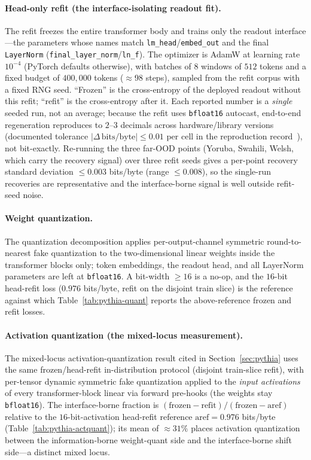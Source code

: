 \documentclass[twocolumn,10pt]{article}
\theoremstyle{definition}
\theoremstyle{remark}
\begin{document}
\paragraph{Head-only refit (the interface-isolating readout fit).} The
refit freezes the entire transformer body and trains only the readout
interface---the parameters whose names match
\texttt{lm\_head}/\texttt{embed\_out} and the final
\texttt{LayerNorm} (\texttt{final\_layer\_norm}/\texttt{ln\_f}). The
optimizer is AdamW at learning rate $10^{-4}$ (PyTorch defaults
otherwise), with batches of $8$ windows of $512$ tokens and a fixed
budget of $400{,}000$ tokens ($\approx 98$ steps), sampled from the
refit corpus with a fixed RNG seed. ``Frozen'' is the cross-entropy of
the deployed readout without this refit; ``refit'' is the cross-entropy
after it. Each reported number is a \emph{single} seeded run, not an
average; because the refit uses \texttt{bfloat16} autocast, end-to-end
regeneration reproduces to $2$--$3$ decimals across hardware/library
versions (documented tolerance $|\Delta\,\text{bits/byte}| \le 0.01$
per cell in the reproduction record~\cite{porepro}), not bit-exactly.
Re-running the three far-OOD points (Yoruba, Swahili, Welsh, which carry
the recovery signal) over three refit seeds gives a per-point recovery
standard deviation $\le 0.003$ bits/byte (range $\le 0.008$), so the
single-run recoveries are representative and the interface-borne signal
is well outside refit-seed noise.

\paragraph{Weight quantization.} The quantization decomposition applies
per-output-channel symmetric round-to-nearest fake quantization to the
two-dimensional linear weights inside the transformer blocks only;
token embeddings, the readout head, and all LayerNorm parameters are
left at \texttt{bfloat16}. A bit-width $\ge 16$ is a no-op, and the
$16$-bit head-refit loss ($0.976$ bits/byte, refit on the disjoint
train slice) is the reference against
which Table~\ref{tab:pythia-quant} reports the above-reference frozen
and refit losses.

\paragraph{Activation quantization (the mixed-locus measurement).} The
mixed-locus activation-quantization result cited in
Section~\ref{sec:pythia} uses the same frozen/head-refit in-distribution
protocol (disjoint train-slice refit), with per-tensor dynamic symmetric
fake quantization applied to
the \emph{input activations} of every transformer-block linear via
forward pre-hooks (the weights stay \texttt{bfloat16}). The
interface-borne fraction is $(\text{frozen}-\text{refit}) /
(\text{frozen}-\text{aref})$ relative to the $16$-bit-activation
head-refit reference $\text{aref} = 0.976$ bits/byte
(Table~\ref{tab:pythia-actquant}); its mean of $\approx\!31\%$ places
activation quantization between the information-borne weight-quant side
and the interface-borne shift side---a distinct mixed locus.
\end{document}
